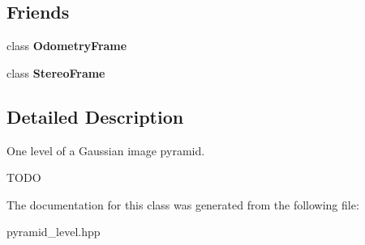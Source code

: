 \subsection*{Friends}
\begin{DoxyCompactItemize}
\item 
\hypertarget{classfovis_1_1PyramidLevel_a50334ce695e3432bfd1bf2210c64f696}{
class {\bfseries OdometryFrame}}
\label{classfovis_1_1PyramidLevel_a50334ce695e3432bfd1bf2210c64f696}

\item 
\hypertarget{classfovis_1_1PyramidLevel_a1b97353efc48811a6a200c07b99c74e6}{
class {\bfseries StereoFrame}}
\label{classfovis_1_1PyramidLevel_a1b97353efc48811a6a200c07b99c74e6}

\end{DoxyCompactItemize}


\subsection{Detailed Description}
One level of a Gaussian image pyramid. 

TODO 

The documentation for this class was generated from the following file:\begin{DoxyCompactItemize}
\item 
pyramid\_\-level.hpp\end{DoxyCompactItemize}
